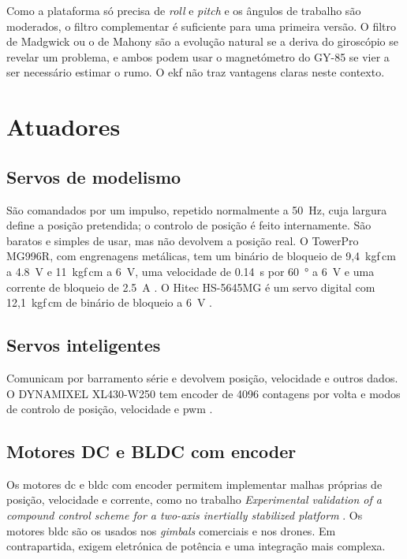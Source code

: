 Como a plataforma só precisa de \textit{roll} e \textit{pitch} e os ângulos de trabalho são moderados, o filtro complementar é suficiente para uma primeira versão. O filtro de Madgwick ou o de Mahony são a evolução natural se a deriva do giroscópio se revelar um problema, e ambos podem usar o magnetómetro do GY-85 se vier a ser necessário estimar o rumo. O \gls{ekf} não traz vantagens claras neste contexto.

\section{Atuadores}

\subsection{Servos de modelismo}
São comandados por um impulso, repetido normalmente a \SI{50}{\hertz}, cuja largura define a posição pretendida; o controlo de posição é feito internamente. São baratos e simples de usar, mas não devolvem a posição real. O TowerPro MG996R, com engrenagens metálicas, tem um binário de bloqueio de 9,4~kgf\,cm a \SI{4.8}{\volt} e 11~kgf\,cm a \SI{6}{\volt}, uma velocidade de \SI{0.14}{\second} por \SI{60}{\degree} a \SI{6}{\volt} e uma corrente de bloqueio de \SI{2.5}{\ampere} \cite{mg996r}. O Hitec HS-5645MG é um servo digital com 12,1~kgf\,cm de binário de bloqueio a \SI{6}{\volt} \cite{hitec}.

\subsection{Servos inteligentes}
Comunicam por barramento série e devolvem posição, velocidade e outros dados. O DYNAMIXEL XL430-W250 tem encoder de 4096 contagens por volta e modos de controlo de posição, velocidade e \gls{pwm} \cite{robotis}.

\subsection{Motores DC e BLDC com encoder}
Os motores \gls{dc} e \gls{bldc} com encoder permitem implementar malhas próprias de posição, velocidade e corrente, como no trabalho \textit{Experimental validation of a compound control scheme for a two-axis inertially stabilized platform} \cite{zhou2016}. Os motores \gls{bldc} são os usados nos \textit{gimbals} comerciais e nos drones. Em contrapartida, exigem eletrónica de potência e uma integração mais complexa.

